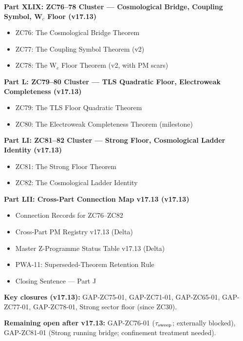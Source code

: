 \documentclass[11pt, a4paper]{article}
\begin{document}
\begin{contentsbox}[title={Part J --- Part and Section Headers}]
\textbf{Part XLIX: ZC76--78 Cluster --- Cosmological Bridge, Coupling
  Symbol, W$_c$ Floor (v17.13)}
\begin{itemize}[noitemsep,leftmargin=1.5em]
  \item ZC76: The Cosmological Bridge Theorem
  \item ZC77: The Coupling Symbol Theorem (v2)
  \item ZC78: The W$_c$ Floor Theorem (v2, with PM scars)
\end{itemize}

\textbf{Part L: ZC79--80 Cluster --- TLS Quadratic Floor, Electroweak
  Completeness (v17.13)}
\begin{itemize}[noitemsep,leftmargin=1.5em]
  \item ZC79: The TLS Floor Quadratic Theorem
  \item ZC80: The Electroweak Completeness Theorem (milestone)
\end{itemize}

\textbf{Part LI: ZC81--82 Cluster --- Strong Floor, Cosmological Ladder
  Identity (v17.13)}
\begin{itemize}[noitemsep,leftmargin=1.5em]
  \item ZC81: The Strong Floor Theorem
  \item ZC82: The Cosmological Ladder Identity
\end{itemize}

\textbf{Part LII: Cross-Part Connection Map v17.13 (v17.13)}
\begin{itemize}[noitemsep,leftmargin=1.5em]
  \item Connection Records for ZC76--ZC82
  \item Cross-Part PM Registry v17.13 (Delta)
  \item Master Z-Programme Status Table v17.13 (Delta)
  \item PWA-11: Superseded-Theorem Retention Rule
  \item Closing Sentence --- Part J
\end{itemize}
\end{contentsbox}

\textbf{Key closures (v17.13):}
GAP-ZC75-01, GAP-ZC71-01, GAP-ZC65-01, GAP-ZC77-01, GAP-ZC78-01,
Strong sector floor (since ZC30).

\textbf{Remaining open after v17.13:}
GAP-ZC76-01 ($\tau_{\rm sweep}$; externally blocked),
GAP-ZC81-01 (Strong running bridge; confinement treatment needed).
\end{document}
